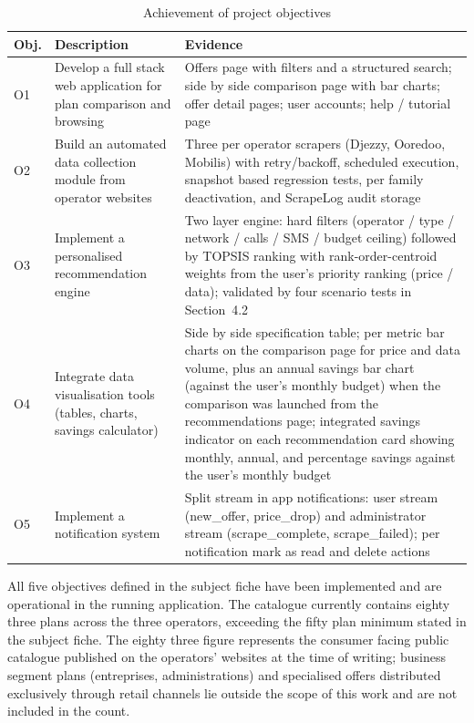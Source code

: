 \begin{table}[H]
  \caption{Achievement of project objectives}
  \label{tab:objectives}
  \centering\small
  \begin{tabular}{|p{0.9cm}|p{6.0cm}|p{7.3cm}|}
    \hline
    \textbf{Obj.} & \textbf{Description} & \textbf{Evidence} \\
    \hline
    O1 & Develop a full stack web application for plan comparison and browsing & Offers page with filters and a structured search; side by side comparison page with bar charts; offer detail pages; user accounts; help / tutorial page \\
    \hline
    O2 & Build an automated data collection module from operator websites & Three per operator scrapers (Djezzy, Ooredoo, Mobilis) with retry/backoff, scheduled execution, snapshot based regression tests, per family deactivation, and ScrapeLog audit storage \\
    \hline
    O3 & Implement a personalised recommendation engine & Two layer engine: hard filters (operator / type / network / calls / SMS / budget ceiling) followed by TOPSIS ranking with rank-order-centroid weights from the user's priority ranking (price / data); validated by four scenario tests in Section~4.2 \\
    \hline
    O4 & Integrate data visualisation tools (tables, charts, savings calculator) & Side by side specification table; per metric bar charts on the comparison page for price and data volume, plus an annual savings bar chart (against the user's monthly budget) when the comparison was launched from the recommendations page; integrated savings indicator on each recommendation card showing monthly, annual, and percentage savings against the user's monthly budget \\
    \hline
    O5 & Implement a notification system & Split stream in app notifications: user stream (new\_offer, price\_drop) and administrator stream (scrape\_complete, scrape\_failed); per notification mark as read and delete actions \\
    \hline
  \end{tabular}
\end{table}

All five objectives defined in the subject fiche have been implemented and are operational in the running application. The catalogue currently contains eighty three plans across the three operators, exceeding the fifty plan minimum stated in the subject fiche. The eighty three figure represents the consumer facing public catalogue published on the operators' websites at the time of writing; business segment plans (entreprises, administrations) and specialised offers distributed exclusively through retail channels lie outside the scope of this work and are not included in the count.

